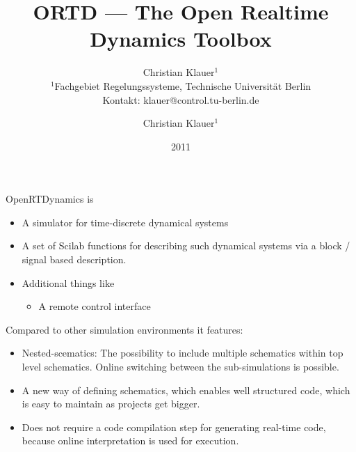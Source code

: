 \documentclass[serif,9pt,xcolor=dvipsnames]{beamer}
\title[]{ORTD --- The Open Realtime Dynamics Toolbox}
\subtitle{} %
\date{2011}
\author{Christian Klauer$^{1}$\\
{\tiny $^{1}$Fachgebiet Regelungssysteme, Technische Universität Berlin\\
Kontakt: klauer@control.tu-berlin.de}
}
\begin{document}

\author{Christian Klauer$^{1}$}



\begin{frame}
  \maketitle
\end{frame}


\begin{frame}

OpenRTDynamics is

 \begin{itemize}
  \item A simulator for time-discrete dynamical systems
  \item A set of Scilab functions for describing such dynamical systems via a block / signal based description.
  \item Additional things like
  \begin{itemize}
    \item A remote control interface
   \end{itemize}
 \end{itemize}

Compared to other simulation environments it features:
\begin{itemize}
 \item Nested-scematics: The possibility to include multiple schematics within top level schematics. Online switching between the sub-simulations is possible.
 \item A new way of defining schematics, which enables well structured code, which is easy to maintain as projects get bigger.
\item Does not require a code compilation step for generating real-time code, because online interpretation is used for execution.
\end{itemize}


\end{frame}
\end{document}
